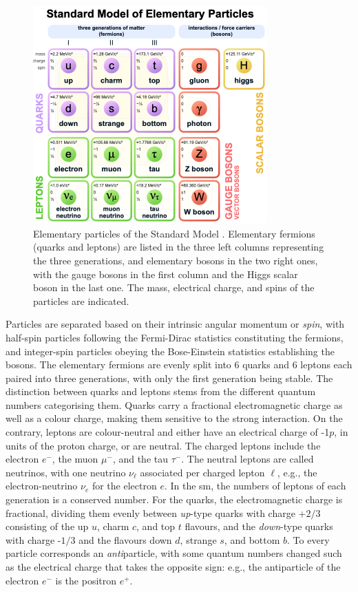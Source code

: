 \begin{figure}[!h]
    \centering
    \includegraphics[width=0.8\textwidth]{Images/Theory/SMpart.png}
    \caption[Particles in the SM]{Elementary particles of the Standard Model \cite{tableSMWiki}. Elementary fermions (quarks and leptons) are listed in the three left columns representing the three generations, and elementary bosons in the two right ones, with the gauge bosons in the first column and the Higgs scalar boson in the last one. The mass, electrical charge, and spins of the particles are indicated.}
    \label{particlesSM}
\end{figure}

Particles are separated based on their intrinsic angular momentum or \textit{spin}, with half-spin particles following the Fermi-Dirac statistics constituting the fermions, and integer-spin particles obeying the Bose-Einstein statistics establishing the bosons. The elementary fermions are evenly split into 6 quarks and 6 leptons each paired into three generations, with only the first generation being stable. The distinction between quarks and leptons stems from the different quantum numbers categorising them. Quarks carry a fractional electromagnetic charge as well as a colour charge, making them sensitive to the strong interaction. On the contrary, leptons are colour-neutral and either have an electrical charge of -1$p$, in units of the proton charge, or are neutral. The charged leptons include the electron $e^-$, the muon $\mu^-$, and the tau $\tau^-$. The neutral leptons are called neutrinos, with one neutrino $\nu_\ell$ associated per charged lepton $\ell$, e.g., the electron-neutrino $\nu_e$ for the electron $e$. In the \gls{sm}, the numbers of leptons of each generation is a conserved number. For the quarks, the electromagnetic charge is fractional, dividing them evenly between \textit{up}-type quarks with charge +$2/3$ consisting of the up $u$, charm $c$, and top $t$ flavours, and the \textit{down}-type quarks with charge -$1/3$ and the flavours down $d$, strange $s$, and bottom $b$. To every particle corresponds an \textit{anti}particle, with some quantum numbers changed such as the electrical charge that takes the opposite sign: e.g., the antiparticle of the electron $e^-$ is the positron $e^+$. \\

